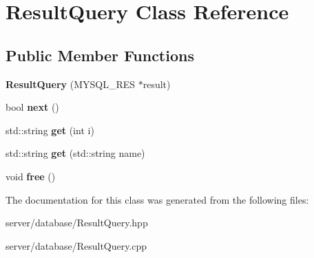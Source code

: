 \hypertarget{class_result_query}{\section{Result\-Query Class Reference}
\label{class_result_query}
}
\subsection*{Public Member Functions}
\begin{DoxyCompactItemize}
\item 
\hypertarget{class_result_query_a55ea87be94e0c7f56342b97e9b407baf}{{\bfseries Result\-Query} (M\-Y\-S\-Q\-L\-\_\-\-R\-E\-S $\ast$result)}\label{class_result_query_a55ea87be94e0c7f56342b97e9b407baf}

\item 
\hypertarget{class_result_query_a770ccd5a4603adef6346633e2c7625a6}{bool {\bfseries next} ()}\label{class_result_query_a770ccd5a4603adef6346633e2c7625a6}

\item 
\hypertarget{class_result_query_a01ed68727961199356f5b0adbe401050}{std\-::string {\bfseries get} (int i)}\label{class_result_query_a01ed68727961199356f5b0adbe401050}

\item 
\hypertarget{class_result_query_abbd6d438fb6fbe008feeacf7a7920946}{std\-::string {\bfseries get} (std\-::string name)}\label{class_result_query_abbd6d438fb6fbe008feeacf7a7920946}

\item 
\hypertarget{class_result_query_a867303431e3dc65bc51719cc8daef8da}{void {\bfseries free} ()}\label{class_result_query_a867303431e3dc65bc51719cc8daef8da}

\end{DoxyCompactItemize}


The documentation for this class was generated from the following files\-:\begin{DoxyCompactItemize}
\item 
server/database/Result\-Query.\-hpp\item 
server/database/Result\-Query.\-cpp\end{DoxyCompactItemize}
